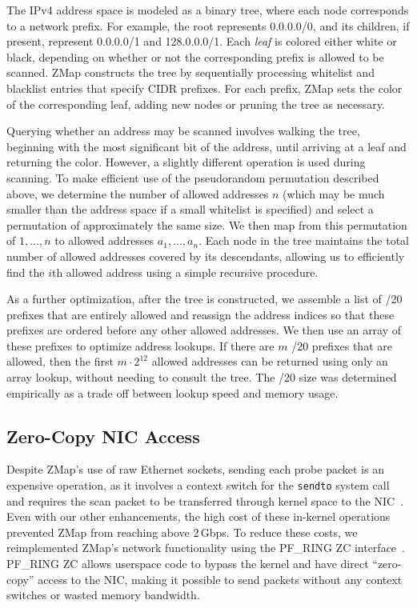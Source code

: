 The IPv4 address space is modeled as a binary tree, where each node
corresponds to a network prefix. For example, the root represents 0.0.0.0/0,
and its children, if present, represent 0.0.0.0/1 and 128.0.0.0/1. Each
\emph{leaf} is colored either white or black, depending on whether or not the
corresponding prefix is allowed to be scanned. ZMap constructs the tree by
sequentially processing whitelist and blacklist entries that specify CIDR
prefixes. For each prefix, ZMap sets the color of the corresponding leaf,
adding new nodes or pruning the tree as necessary.

Querying whether an address may be scanned involves walking the tree,
beginning with the most significant bit of the address, until arriving at a
leaf and returning the color. However, a slightly different operation is used
during scanning. To make efficient use of the pseudorandom permutation
described above, we determine the number of allowed addresses $n$ (which may
be much smaller than the address space if a small whitelist is specified) and
select a permutation of approximately the same size. We then map from this
permutation of $1,\ldots,n$ to allowed addresses $a_1,\ldots,a_n$. Each node
in the tree maintains the total number of allowed addresses covered by its
descendants, allowing us to efficiently find the $i$th allowed address using
a simple recursive procedure.
 
As a further optimization, after the tree is constructed, we assemble a list
of /20 prefixes that are entirely allowed and reassign the address indices so
that these prefixes are ordered before any other allowed addresses. We then
use an array of these prefixes to optimize address lookups. If there are $m$
/20 prefixes that are allowed, then the first $m\cdot2^{12}$ allowed
addresses can be returned using only an array lookup, without needing to
consult the tree. The /20 size was determined empirically as a trade off
between lookup speed and memory usage.
 
\subsection{Zero-Copy NIC Access}
\label{sec:zc}
 
Despite ZMap's use of raw Ethernet sockets, sending each probe packet is an
expensive operation, as it involves a context switch for the \texttt{sendto}
system call and requires the scan packet to be transferred through kernel
space to the NIC~\cite{pfring-original, ten-gig-commodity}. Even with our
other enhancements, the high cost of these in-kernel operations prevented
ZMap from reaching above 2\,Gbps. To reduce these costs, we reimplemented
ZMap's network functionality using the PF\_RING ZC
interface~\cite{pfring-zc}. PF\_RING ZC allows userspace code to bypass the
kernel and have direct ``zero-copy'' access to the NIC\@, making it possible
to send packets without any context switches or wasted memory bandwidth.
 
